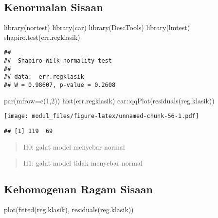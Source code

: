 \documentclass[
]{book}
\newenvironment{Shaded}{\begin{snugshade}}{\end{snugshade}}
\newcommand{\AttributeTok}[1]{\textcolor[rgb]{0.77,0.63,0.00}{#1}}
\newcommand{\DecValTok}[1]{\textcolor[rgb]{0.00,0.00,0.81}{#1}}
\newcommand{\FunctionTok}[1]{\textcolor[rgb]{0.00,0.00,0.00}{#1}}
\newcommand{\NormalTok}[1]{#1}
\newcommand{\SpecialCharTok}[1]{\textcolor[rgb]{0.00,0.00,0.00}{#1}}
\begin{document}
\hypertarget{kenormalan-sisaan}{%
\subsection{Kenormalan Sisaan}\label{kenormalan-sisaan}}

\begin{Shaded}
\begin{Highlighting}[]
\FunctionTok{library}\NormalTok{(nortest)}
\FunctionTok{library}\NormalTok{(car)}
\FunctionTok{library}\NormalTok{(DescTools)}
\FunctionTok{library}\NormalTok{(lmtest)}
\FunctionTok{shapiro.test}\NormalTok{(err.regklasik)}
\end{Highlighting}
\end{Shaded}

\begin{verbatim}
## 
##  Shapiro-Wilk normality test
## 
## data:  err.regklasik
## W = 0.98607, p-value = 0.2608
\end{verbatim}

\begin{Shaded}
\begin{Highlighting}[]
\FunctionTok{par}\NormalTok{(}\AttributeTok{mfrow=}\FunctionTok{c}\NormalTok{(}\DecValTok{1}\NormalTok{,}\DecValTok{2}\NormalTok{))}
\FunctionTok{hist}\NormalTok{(err.regklasik)}
\NormalTok{car}\SpecialCharTok{::}\FunctionTok{qqPlot}\NormalTok{(}\FunctionTok{residuals}\NormalTok{(reg.klasik))}
\end{Highlighting}
\end{Shaded}

\texttt{[image: modul\_files/figure-latex/unnamed-chunk-56-1.pdf]}

\begin{verbatim}
## [1] 119  69
\end{verbatim}

\begin{quote}
H0: galat model menyebar normal
\end{quote}

\begin{quote}
H1: galat model tidak menyebar normal
\end{quote}

\hypertarget{kehomogenan-ragam-sisaan}{%
\subsection{Kehomogenan Ragam Sisaan}\label{kehomogenan-ragam-sisaan}}

\begin{Shaded}
\begin{Highlighting}[]
\FunctionTok{plot}\NormalTok{(}\FunctionTok{fitted}\NormalTok{(reg.klasik), }\FunctionTok{residuals}\NormalTok{(reg.klasik))}
\end{Highlighting}
\end{Shaded}
\end{document}

